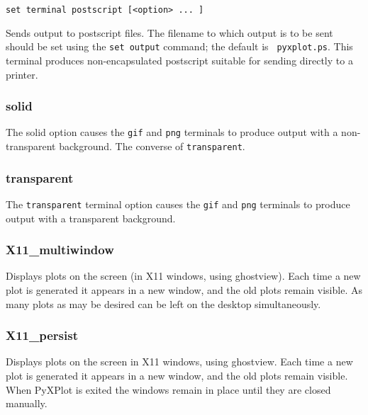 \documentclass[a4paper,onecolumn,11pt]{book}
\begin{document}
\begin{verbatim}
set terminal postscript [<option> ... ]
\end{verbatim}

Sends output to postscript files. The filename to which output is to be sent
should be set using the {\tt set output} command; the default is {\tt
pyxplot.ps}.  This terminal produces non-encapsulated postscript suitable for
sending directly to a printer.

\subsubsection{solid}

The solid option causes the {\tt gif} and {\tt png} terminals to produce output
with a non-transparent background. The converse of {\tt transparent}.


\subsubsection{transparent}

The {\tt transparent} terminal option causes the {\tt gif} and {\tt png}
terminals to produce output with a transparent background.


\subsubsection{X11\_multiwindow}

Displays plots on the screen (in X11 windows, using ghostview). Each time a new
plot is generated it appears in a new window, and the old plots remain visible.
As many plots as may be desired can be left on the desktop simultaneously.

\subsubsection{X11\_persist}

Displays plots on the screen in X11 windows, using ghostview.  Each time a new
plot is generated it appears in a new window, and the old plots remain visible.
When PyXPlot is exited the windows remain in place until they are closed
manually.
\end{document}
